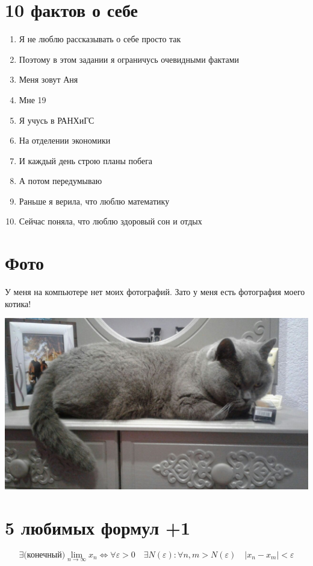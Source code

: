 \documentclass[12pt, a4paper]{article}
\begin{document}
\section{10 фактов о себе}

\begin{enumerate}
\item Я не люблю рассказывать о себе просто так
\item Поэтому в этом задании я ограничусь очевидными фактами
\item Меня зовут Аня
\item Мне 19
\item Я учусь в РАНХиГС
\item На отделении экономики
\item И каждый день строю планы побега
\item А потом передумываю
\item Раньше я верила, что люблю математику
\item Сейчас поняла, что люблю здоровый сон и отдых 
\end{enumerate}

\section{Фото}
У меня на компьютере нет моих фотографий. Зато у меня есть фотография моего котика!

\includegraphics[scale=0.25]{cat.jpg}

\section{5 любимых формул +1}

\begin{equation} \label{n1}
\exists \text{(конечный)} \lim_{n \to \infty} x_n  \Leftrightarrow \forall \varepsilon > 0 \quad  \exists N(\varepsilon) : \forall n, m > N(\varepsilon) \quad |x_n - x_m| < \varepsilon 
\end{equation}
\end{document}
